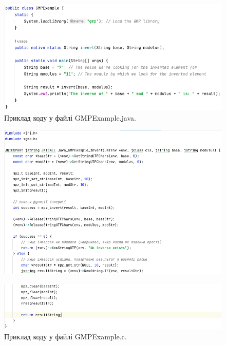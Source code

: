 \begin{figure}[h]
     \centering
     \includegraphics[scale = 0.35]{../IMAGES/Java/GMP_inv_exJava.png}
     \caption{Приклад коду у файлі GMPExample.java.}
     \label{fig_java_GMPinv_java}
\end{figure}
\vspace{-1cm}
\begin{figure}[h]
     \centering
     \includegraphics[scale = 0.37]{../IMAGES/Java/GMP_inv_exC1.png}
     \label{fig_java_GMPinv_C1}
\end{figure}
\vspace{-1cm}
\begin{figure}[h]
     \centering
     \includegraphics[scale = 0.37]{../IMAGES/Java/GMP_inv_exC2.png}
     \caption{Приклад коду у файлі GMPExample.c.}
     \label{fig_java_GMPinv_C2}
\end{figure}

